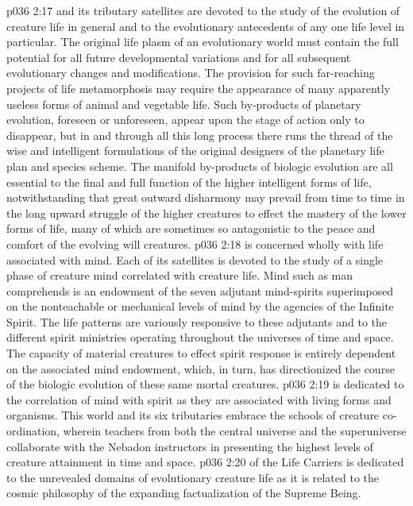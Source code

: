 \vs p036 2:17 \pc {} and its tributary satellites are devoted to the study of the evolution of creature life in general and to the evolutionary antecedents of any one life level in particular. The original life plasm of an evolutionary world must contain the full potential for all future developmental variations and for all subsequent evolutionary changes and modifications. The provision for such far\hyp{}reaching projects of life metamorphosis may require the appearance of many apparently useless forms of animal and vegetable life. Such by\hyp{}products of planetary evolution, foreseen or unforeseen, appear upon the stage of action only to disappear, but in and through all this long process there runs the thread of the wise and intelligent formulations of the original designers of the planetary life plan and species scheme. The manifold by\hyp{}products of biologic evolution are all essential to the final and full function of the higher intelligent forms of life, notwithstanding that great outward disharmony may prevail from time to time in the long upward struggle of the higher creatures to effect the mastery of the lower forms of life, many of which are sometimes so antagonistic to the peace and comfort of the evolving will creatures.
\vs p036 2:18 \pc {} is concerned wholly with life associated with mind. Each of its satellites is devoted to the study of a single phase of creature mind correlated with creature life. Mind such as man comprehends is an endowment of the seven adjutant mind\hyp{}spirits superimposed on the nonteachable or mechanical levels of mind by the agencies of the Infinite Spirit. The life patterns are variously responsive to these adjutants and to the different spirit ministries operating throughout the universes of time and space. The capacity of material creatures to effect spirit response is entirely dependent on the associated mind endowment, which, in turn, has directionized the course of the biologic evolution of these same mortal creatures.
\vs p036 2:19 \pc {} is dedicated to the correlation of mind with spirit as they are associated with living forms and organisms. This world and its six tributaries embrace the schools of creature co\hyp{}ordination, wherein teachers from both the central universe and the superuniverse collaborate with the Nebadon instructors in presenting the highest levels of creature attainment in time and space.
\vs p036 2:20 \pc {} of the Life Carriers is dedicated to the unrevealed domains of evolutionary creature life as it is related to the cosmic philosophy of the expanding factualization of the Supreme Being.
